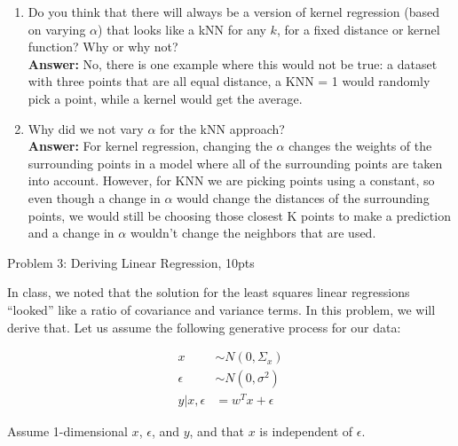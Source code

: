 \documentclass[submit]{harvardml}
\begin{document}
\begin{enumerate}
\item Do you think that there will always be a version of kernel
  regression (based on varying $\alpha$) that looks like a kNN for any
  $k$, for a fixed distance or kernel function?  Why or why not?\\

\textbf{Answer:} 
No, there is one example where this would not be true: a dataset with three points that are all equal distance, a KNN = 1 would randomly pick a point, while a kernel would get the average.\\

\item Why did we not vary $\alpha$ for the kNN approach?  \\ 

\textbf{Answer:} For kernel regression, changing the $\alpha$ changes the weights of the surrounding points in a model where all of the surrounding points are taken into account. However, for KNN we are picking points using a constant, so even though a change in $\alpha$ would change the distances of the surrounding points, we would still be choosing those closest K points to make a prediction and a change in $\alpha$ wouldn't change the neighbors that are used.

\end{enumerate}



\newpage 


Problem 3: Deriving Linear Regression, 10pts

In class, we noted that the solution for the least squares linear regressions ``looked'' like a ratio of covariance and variance terms.  In this problem, we will derive that.  Let us assume the following generative process for our data:

\begin{eqnarray*}
  x &\sim N(0,\Sigma_x) \\
  \epsilon &\sim N(0,\sigma^2)\\
  y | x, \epsilon &= w^Tx + \epsilon 
  \end{eqnarray*}
  
Assume 1-dimensional $x$, $\epsilon$, and $y$, and that $x$ is independent of $\epsilon$.
\end{document}
